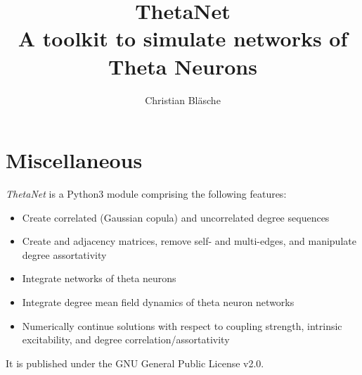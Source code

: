 \documentclass[bibliography=totoc, twoside]{article}
\title{\textbf{ThetaNet} \\ A toolkit to simulate networks of Theta Neurons}
\author{Christian Bl\"asche}
\numberwithin{equation}{section}
\begin{document}
\maketitle
\vspace{1.7in}
\tableofcontents
\thispagestyle{empty}

\newpage
\pagestyle{fance}

\lstset{style=mystyle}

\section{Miscellaneous}

\textit{ThetaNet} is a Python3 module comprising the following features:
\begin{itemize}
\item Create correlated (Gaussian copula) and uncorrelated degree sequences
\item Create and adjacency matrices, remove self- and multi-edges, and manipulate degree assortativity
\item Integrate networks of theta neurons
\item Integrate degree mean field dynamics of theta neuron networks
\item Numerically continue solutions with respect to coupling strength, intrinsic excitability, and degree correlation/assortativity
\end{itemize}
It is published under the GNU General Public License v2.0.
\end{document}
